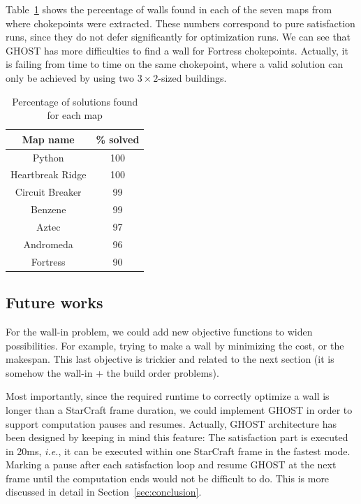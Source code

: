 \documentclass[journal]{IEEEtran}
\newcommand{\ghost}{\textsc{GHOST}\xspace}
\newcommand{\ie}{\textit{i.e.}}
\begin{document}
Table~\ref{tab:map} shows the percentage of walls found in each of the
seven  maps  from where  chokepoints  were  extracted.  These  numbers
correspond  to  pure  satisfaction  runs,  since  they  do  not  defer
significantly for optimization  runs. We can see that  \ghost has more
difficulties to find a wall  for Fortress chokepoints. Actually, it is
failing  from time  to  time on  the same  chokepoint,  where a  valid
solution  can  only  be  achieved  by using  two  $3  \times  2$-sized
buildings.
\begin{table}[ht]
  \caption{Percentage of solutions found for each map} 
    \label{tab:map}
    \centering
    \begin{tabular}{|c|c|}
      \hline
      Map name & \% solved\\
      \hline
      Python & 100\\
      Heartbreak Ridge & 100\\
      Circuit Breaker & 99\\
      Benzene & 99\\
      Aztec & 97\\
      Andromeda & 96\\
      Fortress & 90\\
      \hline
    \end{tabular}  
\end{table}
\subsection{Future works}

For the wall-in problem, we could add new objective functions to widen
possibilities. For  example, trying to  make a wall by  minimizing the
cost, or the makespan.  This last objective is trickier and related to
the  next  section (it  is  somehow  the  wall-in  + the  build  order
problems).

Most importantly, since  the required runtime to  correctly optimize a
wall is  longer than  a StarCraft frame  duration, we  could implement
\ghost in order  to support computation pauses  and resumes. Actually,
\ghost architecture has been designed by keeping in mind this feature:
The satisfaction  part is executed  in 20ms,  \ie, it can  be executed
within one StarCraft frame in the fastest mode.  Marking a pause after
each satisfaction loop  and resume \ghost at the next  frame until the
computation ends would not be difficult  to do. This is more discussed
in detail in Section~\ref{sec:conclusion}.
\end{document}
